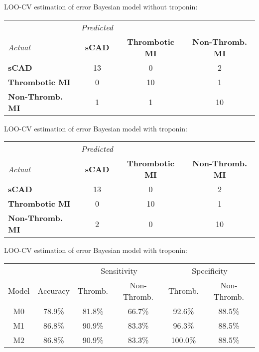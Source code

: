 \documentclass[xcolor=dvipsnames]{beamer}
\begin{document}
\begin{frame}{LOO-CV estimation of error}
\vspace{-15pt}
Bayesian model without troponin:
\vspace{4ex}

\begin{tabular}{l|ccc}
& \emph{Predicted} & & \\
\emph{Actual} &  \textbf{sCAD} & \textbf{Thrombotic MI} & \textbf{Non-Thromb. MI} \\
\hline
\textbf{sCAD}   &     13    &     0    &     2\\
\textbf{Thrombotic MI}  &  0    &    10    &     1\\
\textbf{Non-Thromb. MI} &   1    &     1   &     10
\end{tabular}
\end{frame}

\begin{frame}{LOO-CV estimation of error}
\vspace{-15pt}
Bayesian model with troponin:
\vspace{4ex}

\begin{tabular}{l|ccc}
& \emph{Predicted} & & \\
\emph{Actual}  &     \textbf{sCAD} & \textbf{Thrombotic MI} & \textbf{Non-Thromb. MI} \\
\hline
\textbf{sCAD}   &     13    &     0    &     2\\
\textbf{Thrombotic MI}  &  0    &    10    &     1\\
\textbf{Non-Thromb. MI} &   2  &   0 &    10
\end{tabular}
\end{frame}

\begin{frame}{LOO-CV estimation of error}
\vspace{-15pt}
Bayesian model with troponin:
\vspace{2ex}
\begin{center}
\begin{tabular}{|c|c|cc|cc|}
\hline
& & \multicolumn{2}{|c|}{Sensitivity} & \multicolumn{2}{|c|}{Specificity} \\
Model & Accuracy & Thromb. & Non-Thromb. &  Thromb. & Non-Thromb.  \\
\hline
M0 & 78.9\% & 81.8\% & 66.7\% & 92.6\% & 88.5\% \\
M1 & 86.8\% & 90.9\% & 83.3\% & 96.3\% & 88.5\% \\
M2 & 86.8\% & 90.9\% & 83.3\% & 100.0\% & 88.5\% \\
\hline
\end{tabular}
\end{center}
\end{frame}
\end{document}
